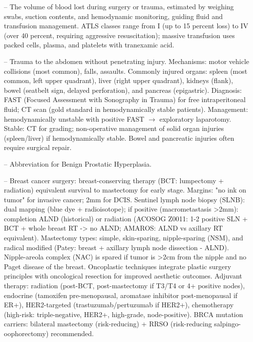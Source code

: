 -- The volume of blood lost during surgery or trauma, estimated by weighing swabs, suction contents, and hemodynamic monitoring, guiding fluid and transfusion management. ATLS classes range from I (up to 15 percent loss) to IV (over 40 percent, requiring aggressive resuscitation); massive transfusion uses packed cells, plasma, and platelets with tranexamic acid.

-- Trauma to the abdomen without penetrating injury. Mechanisms: motor vehicle collisions (most common), falls, assaults. Commonly injured organs: spleen (most common, left upper quadrant), liver (right upper quadrant), kidneys (flank), bowel (seatbelt sign, delayed perforation), and pancreas (epigastric). Diagnosis: FAST (Focused Assessment with Sonography in Trauma) for free intraperitoneal fluid; CT scan (gold standard in hemodynamically stable patients). Management: hemodynamically unstable with positive FAST $\rightarrow$ exploratory laparotomy. Stable: CT for grading; non-operative management of solid organ injuries (spleen/liver) if hemodynamically stable. Bowel and pancreatic injuries often require surgical repair.

-- Abbreviation for Benign Prostatic Hyperplasia.

-- Breast cancer surgery: breast-conserving therapy (BCT: lumpectomy + radiation) equivalent survival to mastectomy for early stage. Margins: "no ink on tumor" for invasive cancer; 2mm for DCIS. Sentinel lymph node biopsy (SLNB): dual mapping (blue dye + radioisotope); if positive (macrometastasis >2mm): completion ALND (historical) or radiation (ACOSOG Z0011: 1-2 positive SLN + BCT + whole breast RT -> no ALND; AMAROS: ALND vs axillary RT equivalent). Mastectomy types: simple, skin-sparing, nipple-sparing (NSM), and radical modified (Patey: breast + axillary lymph node dissection - ALND). Nipple-areola complex (NAC) is spared if tumor is >2cm from the nipple and no Paget disease of the breast. Oncoplastic techniques integrate plastic surgery principles with oncological resection for improved aesthetic outcomes. Adjuvant therapy: radiation (post-BCT, post-mastectomy if T3/T4 or 4+ positive nodes), endocrine (tamoxifen pre-menopausal, aromatase inhibitor post-menopausal if ER+), HER2-targeted (trastuzumab/pertuzumab if HER2+), chemotherapy (high-risk: triple-negative, HER2+, high-grade, node-positive). BRCA mutation carriers: bilateral mastectomy (risk-reducing) + RRSO (risk-reducing salpingo-oophorectomy) recommended.

